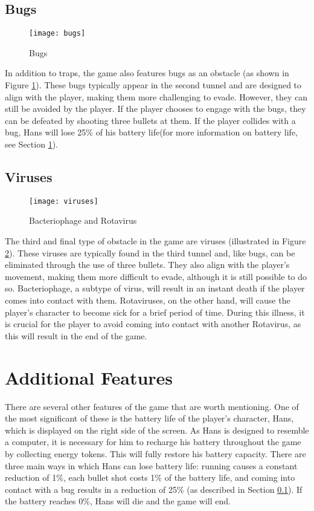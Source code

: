 \subsection{Bugs}
\label{Bugs}
\begin{figure}[h]
    \centering
    \texttt{[image: bugs]}
    \caption{Bugs}
    \label{fig:mesh2}
\end{figure}
In addition to traps, the game also features bugs as an obstacle (as shown in Figure \ref{fig:mesh2}). These bugs typically appear in the second tunnel and are designed to align with the player, making them more challenging to evade. However, they can still be avoided by the player. If the player chooses to engage with the bugs, they can be defeated by shooting three bullets at them. If the player collides with a bug, Hans will lose 25\% of his battery life(for more information on battery life, see Section \ref{AdditionalFeatures}).

\subsection{Viruses}
	\begin{figure}[h]
    \centering
    \texttt{[image: viruses]}
    \caption{Bacteriophage and Rotavirus}
    \label{fig:mesh3}
\end{figure}
The third and final type of obstacle in the game are viruses (illustrated in Figure \ref{fig:mesh3}). These viruses are typically found in the third tunnel and, like bugs, can be eliminated through the use of three bullets. They also align with the player's movement, making them more difficult to evade, although it is still possible to do so. Bacteriophage, a subtype of virus, will result in an instant death if the player comes into contact with them. Rotaviruses, on the other hand, will cause the player's character to become sick for a brief period of time. During this illness, it is crucial for the player to avoid coming into contact with another Rotavirus, as this will result in the end of the game.

\section{Additional Features}
\label{AdditionalFeatures}
There are several other features of the game that are worth mentioning. One of the most significant of these is the battery life of the player's character, Hans, which is displayed on the right side of the screen. As Hans is designed to resemble a computer, it is necessary for him to recharge his battery throughout the game by collecting energy tokens. This will fully restore his battery capacity. There are three main ways in which Hans can lose battery life: running causes a constant reduction of 1\%, each bullet shot costs 1\% of the battery life, and coming into contact with a bug results in a reduction of 25\% (as described in Section \ref{Bugs}). If the battery reaches 0\%, Hans will die and the game will end.

